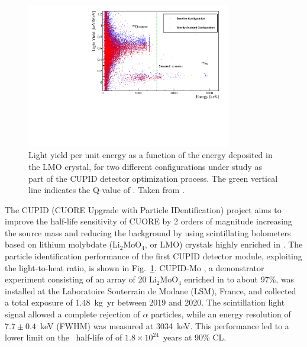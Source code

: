 \begin{figure}[t!b!]
\begin{center}
\includegraphics[width=0.8\textwidth]{img/cupid.pdf}
\end{center}
\caption{Light yield per unit energy as a function of the energy deposited in the LMO crystal, for two different configurations under study as part of the CUPID detector optimization process. The green vertical line indicates the Q-value of . Taken from \cite{CUPID:2022opf}.} \label{fig:cupid}
\end{figure}

The CUPID (CUORE Upgrade with Particle IDentification) \cite{CUPID:2019imh} project aims to improve the half-life sensitivity of CUORE by 2 orders of magnitude increasing the source mass and reducing the background by using scintillating bolometers based on lithium molybdate (Li$_2$MoO$_4$, or LMO) crystals highly enriched in . The particle identification performance of the first CUPID detector module, exploiting the light-to-heat ratio, is shown in Fig.~\ref{fig:cupid}. CUPID-Mo \cite{Augier:2022znx}, a demonstrator experiment consisting of an array of 20 Li$_2$MoO$_4$ enriched in  to about 97\%, was installed at the Laboratoire Souterrain de Modane (LSM), France, and collected a total exposure of 1.48~kg~yr between 2019 and 2020. The scintillation light signal allowed a complete rejection of $\alpha$ particles, while an energy resolution of $7.7\pm0.4$~keV (FWHM) was measured at 3034~keV. This performance led to a lower limit on the \bbonu\ half-life of  of $1.8\times10^{24}$~years at 90\% CL. 

